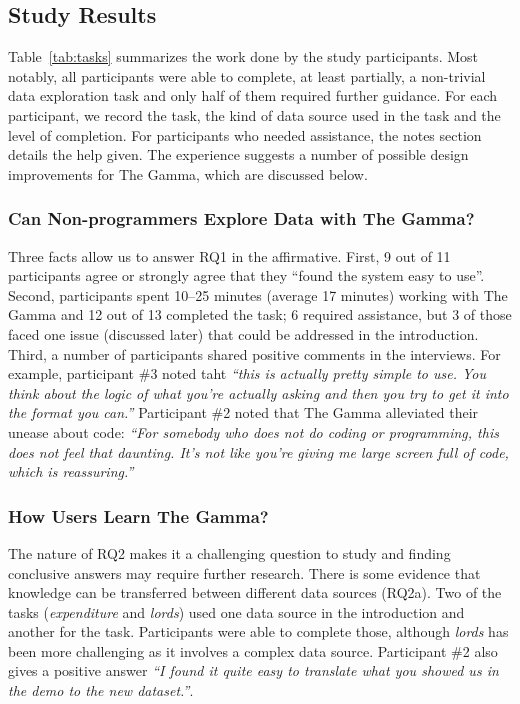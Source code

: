 \documentclass[manuscript,review,anonymous]{acmart}
\begin{document}
\subsection{Study Results}
Table~\ref{tab:tasks} summarizes the work done by the study participants. Most notably, all
participants were able to complete, at least partially, a non-trivial data exploration task and
only half of them required further guidance. For each participant, we record the task, the kind
of data source used in the task and the level of completion. For participants who needed assistance,
the notes section details the help given. The experience suggests a number of possible design
improvements for The Gamma, which are discussed below.

\subsubsection*{Can Non-programmers Explore Data with The Gamma?}
Three facts allow us to answer RQ1 in the affirmative. First, 9 out of 11 participants agree or
strongly agree that they ``found the system easy to use''. Second, participants spent 10--25 minutes
(average 17 minutes) working with The Gamma and 12 out of 13 completed the task; 6 required assistance,
but 3 of those faced one issue (discussed later) that could be addressed in the introduction.
Third, a number of participants shared positive comments in the interviews.
For example, participant \#3 noted taht \emph{``this is actually pretty simple to use.
You think about the logic of what you're actually asking and then you try to get it into the format you can.''}
Participant \#2 noted that The Gamma alleviated their unease about code:
\emph{``For somebody who does not do coding or programming, this does not feel that daunting.
  It's not like you're giving me large screen full of code, which is reassuring.''}


\subsubsection*{How Users Learn The Gamma?}
The nature of RQ2 makes it a challenging question to study and finding conclusive answers
may require further research. There is some evidence that knowledge can be transferred between
different data sources (RQ2a). Two of the tasks (\emph{expenditure} and \emph{lords}) used
one data source in the introduction and another for the task. Participants were able to complete
those, although \emph{lords} has been more challenging as it involves a complex data source.
Participant \#2 also gives a positive answer \emph{``I found it quite easy to translate what you
showed us in the demo to the new dataset.''}.
\end{document}
